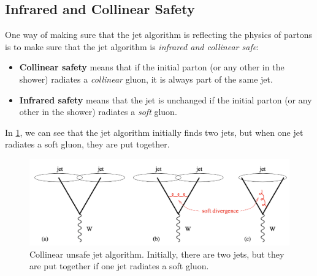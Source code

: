 \subsection{Infrared and Collinear Safety}
\label{sec:IR_coll_safe}
One way of making sure that the jet algorithm is reflecting the physics of partons is to make sure that the jet algorithm is \emph{infrared and collinear safe}:
\begin{itemize}
    \item \textbf{Collinear safety} means that if the initial parton (or any other in the shower) radiates a \emph{collinear} gluon, it is always part of the same jet.
    \item \textbf{Infrared safety} means that the jet is unchanged if the initial parton (or any other in the shower) radiates a \emph{soft} gluon.
\end{itemize}

In \cref{fig:collinear_safety}, we can see that the jet algorithm initially finds two jets, but when one jet radiates a soft gluon, they are put together.

\begin{figure}[htb]
    \centering
    \includegraphics[width=0.7\linewidth]{src/img/collinear_safety.png}
    \caption{Collinear unsafe jet algorithm. Initially, there are two jets, but they are put together if one jet radiates a soft gluon.}
    \label{fig:collinear_safety}
\end{figure}